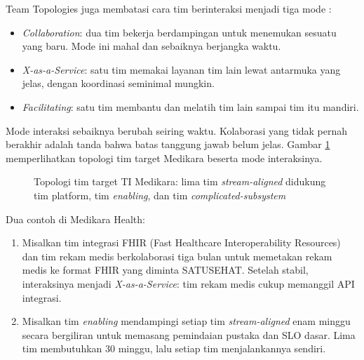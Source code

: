 Team Topologies juga membatasi cara tim berinteraksi menjadi tiga mode \cite{skelton2025}:
\begin{itemize}
  \item \textit{Collaboration}: dua tim bekerja berdampingan untuk menemukan sesuatu yang baru.
        Mode ini mahal dan sebaiknya berjangka waktu.
  \item \textit{X-as-a-Service}: satu tim memakai layanan tim lain lewat antarmuka yang jelas,
        dengan koordinasi seminimal mungkin.
  \item \textit{Facilitating}: satu tim membantu dan melatih tim lain sampai tim itu mandiri.
\end{itemize}
Mode interaksi sebaiknya berubah seiring waktu. Kolaborasi yang tidak pernah berakhir adalah tanda
bahwa batas tanggung jawab belum jelas. Gambar \ref{fig:ch13-topologi} memperlihatkan topologi tim
target Medikara beserta mode interaksinya.

\begin{figure}[!htb]
  \centering
  
  \caption{Topologi tim target TI Medikara: lima tim \textit{stream-aligned} didukung tim
           platform, tim \textit{enabling}, dan tim \textit{complicated-subsystem}}
  \label{fig:ch13-topologi}
\end{figure}

Dua contoh di Medikara Health:
\begin{enumerate}
  \item Misalkan tim integrasi FHIR (Fast Healthcare Interoperability Resources) dan tim rekam
        medis berkolaborasi tiga bulan untuk memetakan rekam medis ke format FHIR yang diminta
        SATUSEHAT. Setelah stabil, interaksinya menjadi \textit{X-as-a-Service}: tim rekam medis
        cukup memanggil API integrasi.
  \item Misalkan tim \textit{enabling} mendampingi setiap tim \textit{stream-aligned} enam minggu
        secara bergiliran untuk memasang pemindaian pustaka dan SLO dasar. Lima tim membutuhkan
        30 minggu, lalu setiap tim menjalankannya sendiri.
\end{enumerate}

